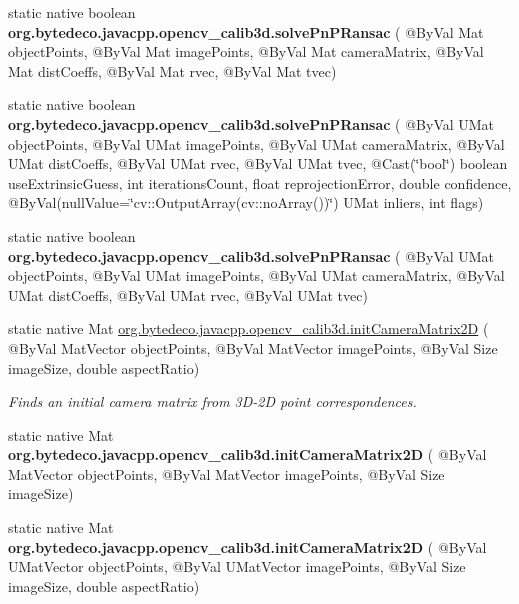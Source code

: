 \begin{DoxyCompactItemize}
static native boolean {\bfseries org.\+bytedeco.\+javacpp.\+opencv\+\_\+calib3d.\+solve\+Pn\+P\+Ransac} ( @By\+Val Mat object\+Points, @By\+Val Mat image\+Points, @By\+Val Mat camera\+Matrix, @By\+Val Mat dist\+Coeffs, @By\+Val Mat rvec, @By\+Val Mat tvec)
\item 
\mbox{\label{group__calib3d_ga17c9f7b76e9f0b546e88e1ebc778d081}} 
static native boolean {\bfseries org.\+bytedeco.\+javacpp.\+opencv\+\_\+calib3d.\+solve\+Pn\+P\+Ransac} ( @By\+Val U\+Mat object\+Points, @By\+Val U\+Mat image\+Points, @By\+Val U\+Mat camera\+Matrix, @By\+Val U\+Mat dist\+Coeffs, @By\+Val U\+Mat rvec, @By\+Val U\+Mat tvec, @Cast(\char`\"{}bool\char`\"{}) boolean use\+Extrinsic\+Guess, int iterations\+Count, float reprojection\+Error, double confidence, @By\+Val(null\+Value=\char`\"{}cv\+::\+Output\+Array(cv\+::no\+Array())\char`\"{}) U\+Mat inliers, int flags)
\item 
\mbox{\label{group__calib3d_gab8c6a4247ae3aa5dc55c7affa7dfc78c}} 
static native boolean {\bfseries org.\+bytedeco.\+javacpp.\+opencv\+\_\+calib3d.\+solve\+Pn\+P\+Ransac} ( @By\+Val U\+Mat object\+Points, @By\+Val U\+Mat image\+Points, @By\+Val U\+Mat camera\+Matrix, @By\+Val U\+Mat dist\+Coeffs, @By\+Val U\+Mat rvec, @By\+Val U\+Mat tvec)
\item 
static native Mat \hyperlink{group__calib3d_ga783c80e734c8368c9db31e3ad820f7fa}{org.\+bytedeco.\+javacpp.\+opencv\+\_\+calib3d.\+init\+Camera\+Matrix2D} ( @By\+Val Mat\+Vector object\+Points, @By\+Val Mat\+Vector image\+Points, @By\+Val Size image\+Size, double aspect\+Ratio)
\begin{DoxyCompactList}\small\item\em Finds an initial camera matrix from 3\+D-\/2D point correspondences. \end{DoxyCompactList}\item 
\mbox{\label{group__calib3d_ga3ae902fa3cb2e36bf9dfff67924693df}} 
static native Mat {\bfseries org.\+bytedeco.\+javacpp.\+opencv\+\_\+calib3d.\+init\+Camera\+Matrix2D} ( @By\+Val Mat\+Vector object\+Points, @By\+Val Mat\+Vector image\+Points, @By\+Val Size image\+Size)
\item 
\mbox{\label{group__calib3d_gad1a36581678200edaef0f588bc5a98ad}} 
static native Mat {\bfseries org.\+bytedeco.\+javacpp.\+opencv\+\_\+calib3d.\+init\+Camera\+Matrix2D} ( @By\+Val U\+Mat\+Vector object\+Points, @By\+Val U\+Mat\+Vector image\+Points, @By\+Val Size image\+Size, double aspect\+Ratio)

\end{DoxyCompactItemize}

